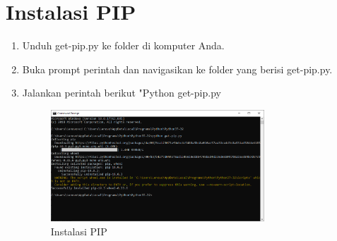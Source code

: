 \section {Instalasi PIP}
\begin{enumerate}
    \item Unduh get-pip.py ke folder di komputer Anda.
    \item Buka prompt perintah dan navigasikan ke folder yang berisi get-pip.py.
    \item Jalankan perintah berikut "Python get-pip.py
		\begin{figure}[!htpb]
			\includegraphics[width=8cm]{figures/4.PNG}
			\centering
			\caption{Instalasi PIP}
		\end{figure}
\end{enumerate}

